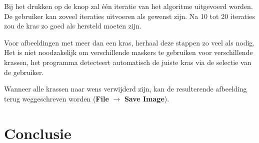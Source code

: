 \documentclass[a4paper,12pt]{article}
\begin{document}
Bij het drukken op de knop zal \'e\'en iteratie van het algoritme uitgevoerd
worden. De gebruiker kan zoveel iteraties uitvoeren als gewenst zijn. Na 10 tot
20 iteraties zou de kras zo goed als hersteld moeten zijn.

Voor afbeeldingen met meer dan een kras, herhaal deze stappen zo veel als
nodig. Het is niet noodzakelijk om verschillende maskers te gebruiken voor
verschillende krassen, het programma detecteert automatisch de juiste kras via
de selectie van de gebruiker.

Wanneer alle krassen naar wens verwijderd zijn, kan de resulterende afbeelding
terug weggeschreven worden (\textbf{File} $\to$ \textbf{Save Image}).

\section{Conclusie}
  
\end{document}
